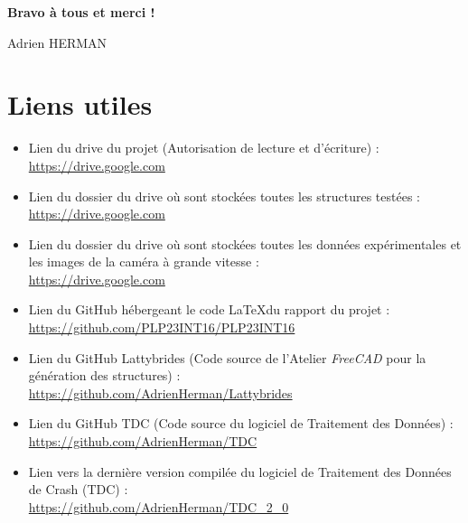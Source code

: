 \documentclass[a4paper]{article}
\begin{document}
	\begin{flushright}
		\textbf{\large Bravo à tous et merci !}
		
		Adrien HERMAN
	\end{flushright}
	
	\vspace{3cm}
	
	\section*{Liens utiles}
	\begin{itemize}
		\item Lien du drive du projet (Autorisation de lecture et d'écriture) :\\ \href{https://drive.google.com/drive/folders/1Y3JJd3HjbAqBD-ykjscEf51ELvaYXhEQ?usp=sharing}{https://drive.google.com}
		
		\item Lien du dossier du drive où sont stockées toutes les structures testées :\\
		\href{https://drive.google.com/drive/folders/1Dxy5Yaq-WHseOIPNWpTo1YhIdbHROOMq?usp=drive_link}{https://drive.google.com}
		
		\item Lien du dossier du drive où sont stockées toutes les données expérimentales et les images de la caméra à grande vitesse :\\
		\href{https://drive.google.com/drive/folders/1GixQ5m0--2UXGmWGoiHR0oR_ZuMvKeyD?usp=drive_link}{https://drive.google.com}
		
		\item Lien du GitHub hébergeant le code \LaTeX du rapport du projet :\\
		\href{https://github.com/PLP23INT16/PLP23INT16}{https://github.com/PLP23INT16/PLP23INT16}
		
		\item Lien du GitHub Lattybrides (Code source de l'Atelier \textit{FreeCAD} pour la génération des structures) :\\ \href{https://github.com/AdrienHerman/Lattybrides/tree/main}{https://github.com/AdrienHerman/Lattybrides}
		
		\item Lien du GitHub TDC (Code source du logiciel de Traitement des Données) :\\ \href{https://github.com/AdrienHerman/TDC-Traitement_des_Donnees_de_Crash}{https://github.com/AdrienHerman/TDC}
		
		\item Lien vers la dernière version compilée du logiciel de Traitement des Données de Crash (TDC) :\\ \href{https://github.com/AdrienHerman/TDC-Traitement_des_Donnees_de_Crash/releases/tag/TDC_2_2}{https://github.com/AdrienHerman/TDC\_2\_0}
	\end{itemize}
	
\end{document}
